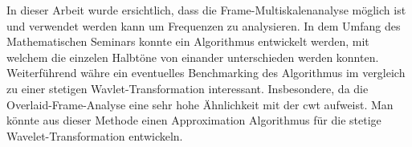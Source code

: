 

In dieser Arbeit wurde ersichtlich, dass die Frame-Multiskalenanalyse möglich ist und verwendet werden kann um Frequenzen zu analysieren. In dem Umfang des Mathematischen Seminars konnte ein Algorithmus entwickelt werden, mit welchem die einzelen Halbtöne von einander unterschieden werden konnten. Weiterführend währe ein eventuelles Benchmarking des Algorithmus im vergleich zu einer stetigen Wavlet-Transformation interessant. Insbesondere, da die Overlaid-Frame-Analyse eine sehr hohe Ähnlichkeit mit der cwt aufweist. Man könnte aus dieser Methode einen Approximation Algorithmus für die stetige Wavelet-Transformation entwickeln. 